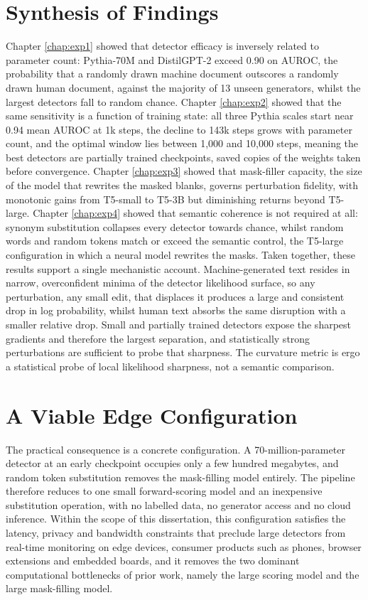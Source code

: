 \documentclass[logo,msc,cs]{infthesis}      %
\begin{document}
\section{Synthesis of Findings}
\label{sec:synthesis}
Chapter \ref{chap:exp1} showed that detector efficacy is inversely related to parameter count: Pythia-70M and DistilGPT-2 exceed 0.90 on AUROC, the probability that a randomly drawn machine document outscores a randomly drawn human document, against the majority of 13 unseen generators, whilst the largest detectors fall to random chance. Chapter \ref{chap:exp2} showed that the same sensitivity is a function of training state: all three Pythia scales start near 0.94 mean AUROC at 1k steps, the decline to 143k steps grows with parameter count, and the optimal window lies between 1,000 and 10,000 steps, meaning the best detectors are partially trained checkpoints, saved copies of the weights taken before convergence. Chapter \ref{chap:exp3} showed that mask-filler capacity, the size of the model that rewrites the masked blanks, governs perturbation fidelity, with monotonic gains from T5-small to T5-3B but diminishing returns beyond T5-large. Chapter \ref{chap:exp4} showed that semantic coherence is not required at all: synonym substitution collapses every detector towards chance, whilst random words and random tokens match or exceed the semantic control, the T5-large configuration in which a neural model rewrites the masks.
Taken together, these results support a single mechanistic account. Machine-generated text resides in narrow, overconfident minima of the detector likelihood surface, so any perturbation, any small edit, that displaces it produces a large and consistent drop in log probability, whilst human text absorbs the same disruption with a smaller relative drop. Small and partially trained detectors expose the sharpest gradients and therefore the largest separation, and statistically strong perturbations are sufficient to probe that sharpness. The curvature metric is ergo a statistical probe of local likelihood sharpness, not a semantic comparison.

\section{A Viable Edge Configuration}
\label{sec:edge_config}
The practical consequence is a concrete configuration. A 70-million-parameter detector at an early checkpoint occupies only a few hundred megabytes, and random token substitution removes the mask-filling model entirely. The pipeline therefore reduces to one small forward-scoring model and an inexpensive substitution operation, with no labelled data, no generator access and no cloud inference. Within the scope of this dissertation, this configuration satisfies the latency, privacy and bandwidth constraints that preclude large detectors from real-time monitoring on edge devices, consumer products such as phones, browser extensions and embedded boards, and it removes the two dominant computational bottlenecks of prior work, namely the large scoring model and the large mask-filling model.
\end{document}
